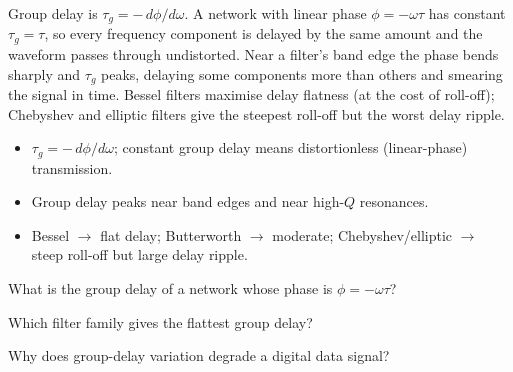 \begin{workedexample}
Group delay is $\tau_g = -\,d\phi/d\omega$. A network with linear phase
$\phi = -\omega\tau$ has constant $\tau_g = \tau$, so every frequency component is
delayed by the same amount and the waveform passes through undistorted. Near a
filter's band edge the phase bends sharply and $\tau_g$ peaks, delaying some
components more than others and smearing the signal in time. Bessel filters
maximise delay flatness (at the cost of roll-off); Chebyshev and elliptic filters
give the steepest roll-off but the worst delay ripple.
\end{workedexample}

\begin{keytakeaways}
\begin{itemize}[leftmargin=1.4em,itemsep=2pt]
\item $\tau_g = -\,d\phi/d\omega$; constant group delay means distortionless (linear-phase) transmission.
\item Group delay peaks near band edges and near high-$Q$ resonances.
\item Bessel $\rightarrow$ flat delay; Butterworth $\rightarrow$ moderate; Chebyshev/elliptic $\rightarrow$ steep roll-off but large delay ripple.
\end{itemize}
\end{keytakeaways}

\begin{exercises}
\item What is the group delay of a network whose phase is $\phi = -\omega\tau$?
\item Which filter family gives the flattest group delay?
\item Why does group-delay variation degrade a digital data signal?
\end{exercises}

